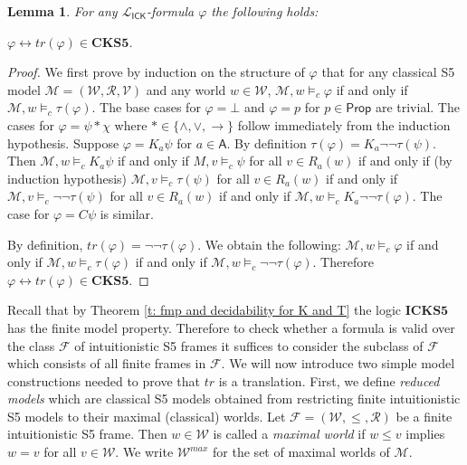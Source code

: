 \documentclass{myifcolog}
\newcommand\C {C}
\newcommand{\K}{K}
\newcommand\Prop {\mathsf{Prop}}
\newcommand\A{\mathsf{A}}
\newcommand{\agi}{a}
\newcommand{\ICK}{\mathsf{ICK}}
\newcommand{\fw}{\mathcal{M}}
\newcommand{\W}{\mathcal{W}}
\newcommand{\rel}{\mathcal{R}}
\newcommand{\V}{\mathcal{V}}
\newtheorem{lemma}[theorem]{Lemma}
\numberwithin{theorem}{section}
\begin{document}
\begin{lemma}\label{l: tr is classicaly equivalent}
    For any $\mathcal{L}_\ICK$-formula $\varphi$ the following holds:
    \begin{center}
        $\varphi  \leftrightarrow tr(\varphi) \in \mathbf{CKS5}$.
    \end{center} 
\end{lemma}
\begin{proof}
     We first prove by induction on the structure of $\varphi$ that for any classical S5 model $\fw=(\W, \rel, \V)$ and any world $w \in \W$, $\fw,w \models_c \varphi$ if and only if $\fw,w \models_c \tau(\varphi)$. The base cases for $\varphi = \bot$ and $\varphi = p$ for $p \in \Prop$ are trivial. The cases for $\varphi = \psi \ast \chi$ where $\ast \in \{\wedge, \vee, \rightarrow\}$ follow immediately from the induction hypothesis. Suppose $\varphi = \K_\agi \psi$ for $\agi \in \A$. By definition $\tau(\varphi) = \K_\agi \neg \neg \tau(\psi)$. Then $\fw,w \models_c K_\agi \psi$ if and only if $M,v \models_c \psi$ for all $v \in R_\agi(w)$ if and only if (by induction hypothesis) $\fw,v \models_c \tau(\psi)$ for all $v \in R_\agi(w)$ if and only if $\fw,v \models_c \neg \neg \tau(\psi)$ for all $v \in R_\agi(w)$ if and only if $\fw,w \models_c \K_\agi \neg \neg \tau(\varphi)$. The case for $\varphi = \C \psi$ is similar.

    By definition, $tr(\varphi) = \neg \neg \tau(\varphi)$. We obtain the following: $\fw,w \models_c \varphi$ if and only if $\fw,w \models_c \tau(\varphi)$ if and only if $\fw,w \models_c \neg \neg \tau(\varphi)$. Therefore $\varphi \leftrightarrow tr(\varphi) \in \mathbf{CKS5}$.
\end{proof}

Recall that by Theorem  \ref{t: fmp and decidability for K and T} the logic $\mathbf{ICKS5}$ has the finite model property. Therefore to check whether a formula is valid over the class $\mathscr{F}$ of intuitionistic S5 frames it suffices to consider the subclass of $\mathscr{F}$ which consists of all finite frames in $\mathscr{F}$. We will now introduce two simple model constructions needed to prove that $tr$ is a translation. First, we define \emph{reduced models} which are classical S5 models obtained from restricting finite intuitionistic S5 models to their maximal (classical) worlds. Let ${\mathcal{F}=(\W, \leq, \rel)}$ be a finite intuitionistic S5 frame. Then $w \in \W$ is called a \emph{maximal world} if $w \leq v$ implies $w = v$ for all $v \in \W$. We write $\W^{max}$ for the set of maximal worlds of $\fw$.
\end{document}
